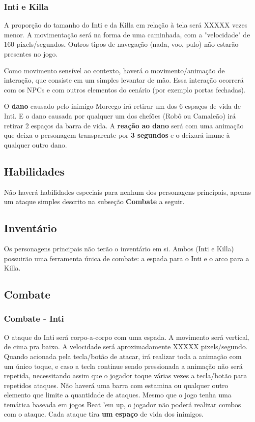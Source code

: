 \documentclass[12pt]{article}
\begin{document}
\subsubsection{Inti e Killa}
A proporção do tamanho do Inti e da Killa em relação à tela será XXXXX vezes
menor. A movimentação será na forma de uma caminhada, com a "velocidade" de 160
pixels/segundos. Outros tipos de navegação (nada, voo, pulo) não estarão
presentes no jogo.

Como movimento sensível ao contexto, haverá o movimento/animação de interação,
que consiste em um simples levantar de mão. Essa interação ocorrerá com os NPCs
e com outros elementos do cenário (por exemplo portas fechadas).

O {\bf dano} causado pelo inimigo Morcego irá retirar um dos 6 espaços de vida de
Inti. E o dano causada por qualquer um dos chefões (Robô ou Camaleão) irá
retirar 2 espaços da barra de vida. A {\bf reação ao dano} será com uma animação
que deixa o personagem transparente por {\bf 3 segundos} e o deixará imune à
qualquer outro dano.

\subsection{Habilidades}
Não haverá habilidades especiais para nenhum dos personagens principais, apenas
um ataque simples descrito na subseção {\bf Combate} a seguir.

\subsection{Inventário}
Os personagens principais não terão o inventário em si. Ambos (Inti e Killa)
possuirão uma ferramenta única de combate: a espada para o Inti e o arco para a
Killa.

\subsection{Combate}
\subsubsection{Combate - Inti}
O ataque do Inti será corpo-a-corpo com uma espada. A movimento será vertical,
de cima pra baixo. A velocidade será aproximadamente XXXXX pixels/segundo. Quando
acionada pela tecla/botão de atacar, irá realizar toda a animação com um único
toque, e caso a tecla continue sendo pressionada a animação  não será repetida,
necessitando assim que o jogador toque várias vezes a tecla/botão para repetidos
ataques. Não haverá uma barra com estamina ou qualquer outro elemento que limite
a quantidade de ataques. Mesmo que o jogo tenha uma temática baseada em jogos
Beat 'em up, o jogador não poderá realizar combos com o ataque. Cada ataque tira
{\bf um espaço} de vida dos inimigos.
\end{document}
